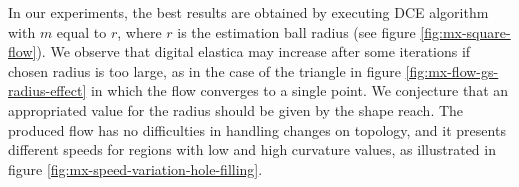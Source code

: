 \documentclass[smallextended]{svjour3}       %
\begin{document}
{In our experiments, the best results are obtained by executing DCE algorithm with $m$ equal to $r$, where $r$ is
  the estimation ball radius (see figure \ref{fig:mx-square-flow}). We observe that digital elastica may increase after some
  iterations if chosen radius is too large, as in the case of the triangle in figure \ref{fig:mx-flow-gs-radius-effect}
  in which the flow converges to a single point. We conjecture that an appropriated value for the radius should be given
  by the shape reach.  The produced flow has no difficulties in handling changes on topology, and it presents different
  speeds for regions with low and high curvature values, as illustrated in figure
  \ref{fig:mx-speed-variation-hole-filling}.

\begin{figure}[hp!]
\center				
		\setcounter{subfigure}{-3}
\end{figure}}
\end{document}
